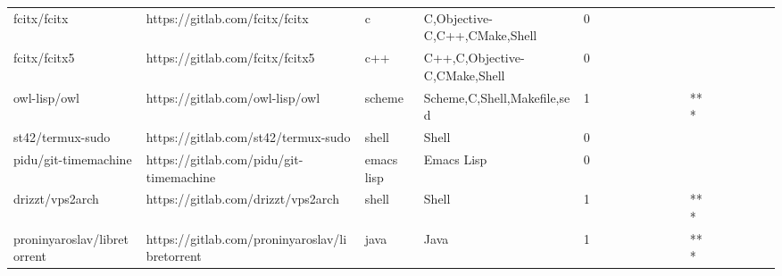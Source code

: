 \begin{tabular}{llllrlllllllllllll}
fcitx/fcitx                                        &                     https://gitlab.com/fcitx/fcitx &                 c &                      C,Objective-C,C++,CMake,Shell &       0 &         &        &           &                &                 &        &           &           &          &          &       &              &          \\
fcitx/fcitx5                                       &                    https://gitlab.com/fcitx/fcitx5 &               c++ &                      C++,C,Objective-C,CMake,Shell &       0 &         &        &           &                &                 &        &           &           &          &          &       &              &          \\
owl-lisp/owl                                       &                    https://gitlab.com/owl-lisp/owl &            scheme &                        Scheme,C,Shell,Makefile,sed &       1 &         &        &           &                &                 &        &           &       *** &          &          &       &              &          \\
st42/termux-sudo                                   &                https://gitlab.com/st42/termux-sudo &             shell &                                              Shell &       0 &         &        &           &                &                 &        &           &           &          &          &       &              &          \\
pidu/git-timemachine                               &            https://gitlab.com/pidu/git-timemachine &        emacs lisp &                                         Emacs Lisp &       0 &         &        &           &                &                 &        &           &           &          &          &       &              &          \\
drizzt/vps2arch                                    &                 https://gitlab.com/drizzt/vps2arch &             shell &                                              Shell &       1 &         &        &           &                &                 &        &           &       *** &          &          &       &              &          \\
proninyaroslav/libretorrent                        &     https://gitlab.com/proninyaroslav/libretorrent &              java &                                               Java &       1 &         &        &           &                &                 &        &           &       *** &          &          &       &              &          \\

\end{tabular}
